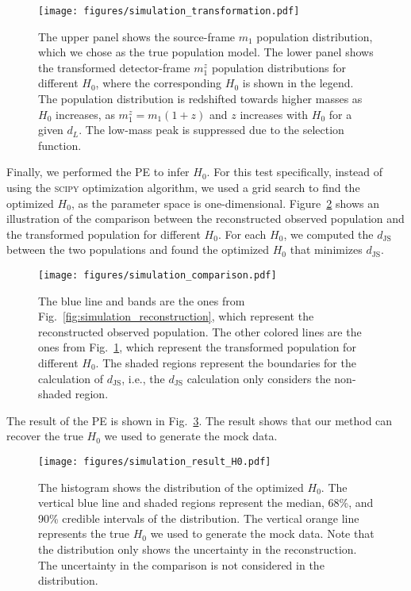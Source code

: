 \documentclass[twocolumn]{aastex631}
\begin{document}
\begin{figure}[h]
    \texttt{[image: figures/simulation\_transformation.pdf]}
    \caption{
        The upper panel shows the source-frame $m_1$ population distribution, which we chose as the true population model.
        The lower panel shows the transformed detector-frame $m^z_1$ population distributions for different $H_0$, where the corresponding $H_0$ is shown in the legend.
        The population distribution is redshifted towards higher masses as $H_0$ increases, as $m^z_1 = m_1(1+z)$ and $z$ increases with $H_0$ for a given $d_L$.
        The low-mass peak is suppressed due to the selection function.
    }
    \label{fig:simulation_transformation}
\end{figure}

Finally, we performed the \ac{PE} to infer $H_0$.
For this test specifically, instead of using the \textsc{scipy} optimization algorithm, we used a grid search to find the optimized $H_0$, as the parameter space is one-dimensional.
Figure~\ref{fig:simulation_comparison} shows an illustration of the comparison between the reconstructed observed population and the transformed population for different $H_0$.
For each $H_0$, we computed the $d_\mathrm{JS}$ between the two populations and found the optimized $H_0$ that minimizes $d_\mathrm{JS}$.

\begin{figure}[h]
    \texttt{[image: figures/simulation\_comparison.pdf]}
    \caption{
        The blue line and bands are the ones from Fig.~\ref{fig:simulation_reconstruction}, which represent the reconstructed observed population.
        The other colored lines are the ones from Fig.~\ref{fig:simulation_transformation}, which represent the transformed population for different $H_0$.
        The shaded regions represent the boundaries for the calculation of $d_\mathrm{JS}$, i.e., the $d_\mathrm{JS}$ calculation only considers the non-shaded region.
    }
    \label{fig:simulation_comparison}
\end{figure}

The result of the \ac{PE} is shown in Fig.~\ref{fig:simulation_result_H0}.
The result shows that our method can recover the true $H_0$ we used to generate the mock data.

\begin{figure}[h]
    \texttt{[image: figures/simulation\_result\_H0.pdf]}
    \caption{
        The histogram shows the distribution of the optimized $H_0$.
        The vertical blue line and shaded regions represent the median, 68\%, and 90\% credible intervals of the distribution.
        The vertical orange line represents the true $H_0$ we used to generate the mock data.
        Note that the distribution only shows the uncertainty in the reconstruction.
        The uncertainty in the comparison is not considered in the distribution.
    }
    \label{fig:simulation_result_H0}
\end{figure}
\end{document}
